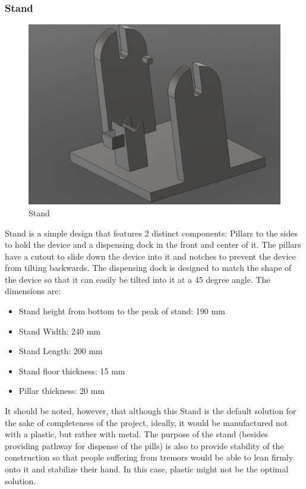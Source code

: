 \subsubsection{Stand}
\begin{figure}[h]
	\centering
	\includegraphics[width=0.7\linewidth]{Figures/Screenshot_14}
	\caption[Stand]{Stand}
	\label{fig:screenshot14}
\end{figure}
Stand is a simple design that features 2 distinct components: Pillars to the sides to hold the device and a dispensing dock in the front and center of it. The pillars have a cutout to slide down the device into it and notches to prevent the device from tilting backwards. The dispensing dock is designed to match the shape of the device so that it can easily be tilted into it at a 45 degree angle.
The dimensions are:
\begin{itemize}
	\item Stand height from bottom to the peak of stand: 190 mm
	\item Stand Width: 240 mm
	\item Stand Length: 200 mm
	\item Stand floor thickness: 15 mm
	\item Pillar thickness: 20 mm
\end{itemize}

It should be noted, however, that although this Stand is the default solution for the sake of completeness of the project, ideally, it would be manufactured not with a plastic, but rather with metal. The purpose of the stand (besides providing pathway for dispense of the pills) is also to provide stability of the construction so that people suffering from tremors would be able to lean firmly onto it and stabilize their hand. In this case, plastic might not be the optimal solution.
\newpage
